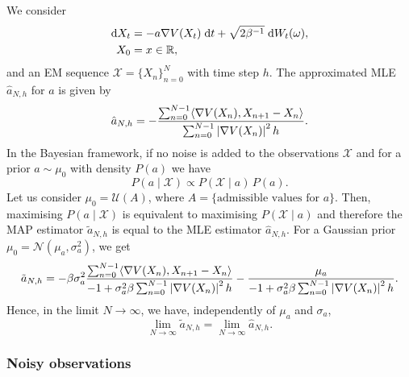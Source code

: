 \documentclass[10pt]{article}
\begin{document}
We consider
\begin{equation}\label{eq:Langevin}
\begin{aligned}
\mathrm{d} X_t &= -a \nabla V(X_t) \; \mathrm{d} t + \sqrt{2\beta^{-1}} \; \mathrm{d} W_t(\omega),\\
X_0 &= x \in \mathbb{R},
\end{aligned}
\end{equation}
and an EM sequence $\mathcal X = \{X_n\}_{n=0}^N$ with time step $h$. The approximated MLE $\hat a_{N, h}$ for $a$ is given by
\begin{equation}
\hat a_{N, h} = - \frac{\sum_{n=0}^{N-1} \langle \nabla V(X_n), X_{n+1} - X_n\rangle}{\sum_{n=0}^{N-1} \left\lvert\nabla V(X_n)\right\rvert^2 h}.
\end{equation}
In the Bayesian framework, if no noise is added to the observations $\mathcal X$ and for a prior $a \sim \mu_0$ with density $P(a)$ we have
\begin{equation}
P(a \mid \mathcal X) \propto P(\mathcal X \mid a) \, P(a).
\end{equation}
Let us consider $\mu_0 = \mathcal U(A)$, where $A = \{\text{admissible values for } a \}$. Then, maximising $P(a \mid \mathcal X)$ is equivalent to maximising $P(\mathcal X \mid a)$ and therefore the MAP estimator $\tilde a_{N, h}$ is equal to the MLE estimator $\hat a_{N, h}$. For a Gaussian prior $\mu_0 = \mathcal N(\mu_a, \sigma^2_a)$, we get
\begin{equation}
\tilde a_{N, h} = - \beta\sigma_a^2 \frac{\sum_{n=0}^{N-1} \langle \nabla V(X_n), X_{n+1} - X_n\rangle}{-1 + \sigma_a^2 \beta \sum_{n=0}^{N-1} \left\lvert\nabla V(X_n)\right\rvert^2 h} - \frac{\mu_a}{-1 + \sigma_a^2 \beta \sum_{n=0}^{N-1} \left\lvert\nabla V(X_n)\right\rvert^2 h}.
\end{equation}
Hence, in the limit $N \to \infty$, we have, independently of $\mu_a$ and $\sigma_a$,
\begin{equation}
\lim_{N\to \infty} \tilde a_{N, h} = \lim_{N\to \infty} \hat a_{N, h}.
\end{equation}

\subsubsection*{Noisy observations}
\end{document}
